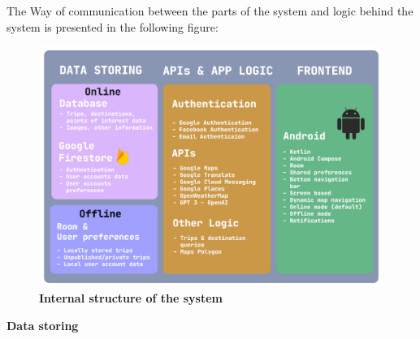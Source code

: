 The Way of communication between the parts of the system and logic behind the system is presented in the following figure:

\begin{figure}[!htb]
\centering
\includegraphics[width=\textwidth]{../Images/InternalStructurePNG_v2.png}
\caption{\label{fig:dbapiuser}\textbf{Internal structure of the system}}
\end{figure}

\textbf{Data storing}\\

